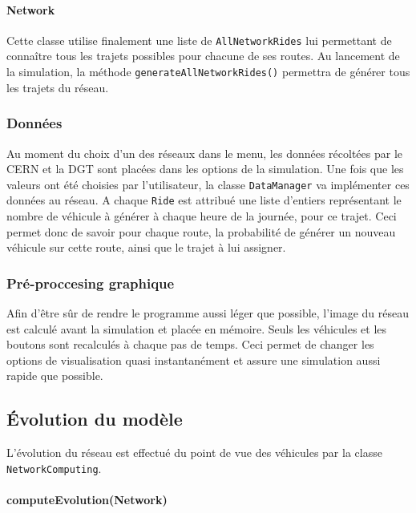 \documentclass[a4paper,11pt, titlepage]{extarticle}
\begin{document}
\paragraph{Network}

Cette classe utilise finalement une liste de \texttt{AllNetworkRides} lui permettant de connaître tous les trajets possibles pour chacune de ses routes. Au lancement de la simulation, la méthode \texttt{generateAllNetworkRides()} permettra de générer tous les trajets du réseau.

\subsubsection{Données}

Au moment du choix d'un des réseaux dans le menu, les données récoltées par le CERN et la DGT sont placées dans les options de la simulation. Une fois que les valeurs ont été choisies par l'utilisateur, la classe \texttt{DataManager} va implémenter ces données au réseau. A chaque \texttt{Ride} est attribué une liste d'entiers représentant le nombre de véhicule à générer à chaque heure de la journée, pour ce trajet. Ceci permet donc de savoir pour chaque route, la probabilité de générer un nouveau véhicule sur cette route, ainsi que le trajet à lui assigner.

\subsubsection{Pré-proccesing graphique}

Afin d'être sûr de rendre le programme aussi léger que possible, l'image du réseau est calculé avant la simulation et placée en mémoire. Seuls les véhicules et les boutons sont recalculés à chaque pas de temps. Ceci permet de changer les options de visualisation quasi instantanément et assure une simulation aussi rapide que possible.

\subsection{Évolution du modèle}

L'évolution du réseau est effectué du point de vue des véhicules par la classe \texttt{NetworkComputing}.

\paragraph{computeEvolution(Network)}
\end{document}
